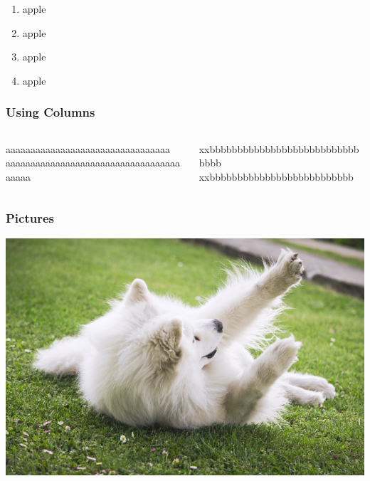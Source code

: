 \documentclass{beamer}
\begin{document}
\begin{frame}
\begin{enumerate}
\item apple
\item apple
\item apple
\item apple
\end{enumerate}
\end{frame}


\begin{frame}
\frametitle{Using Columns}
\begin{columns}
	\begin{column}{0.5\textwidth}
	aaaaaaaaaaaaaaaaaaaaaaaaaaaaaaaaa
	aaaaaaaaaaaaaaaaaaaaaaaaaaaaaaaaaaaaaaaa
	\end{column}
	\begin{column}{0.5\textwidth}
	xxbbbbbbbbbbbbbbbbbbbbbbbbbbbbbbb
	xxbbbbbbbbbbbbbbbbbbbbbbbbbb
	\end{column}
\end{columns}
\end{frame}

\begin{frame}
\frametitle{Pictures}
\includegraphics[scale=1]{samoyed.jpg}
\end{frame}
\end{document}

